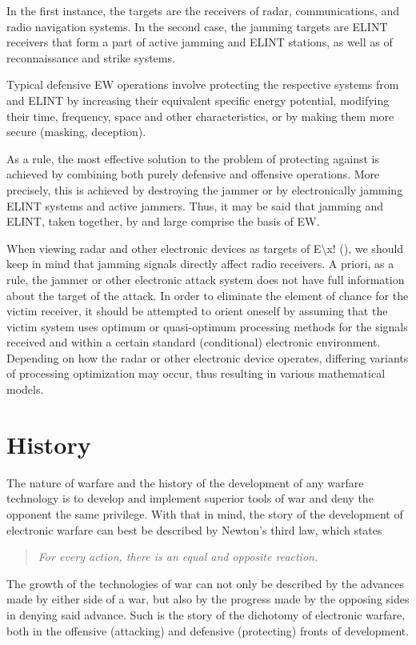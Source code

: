 \documentclass[english,purist]{ist-report}
\begin{document}
In the first instance, the \jamming{} targets are the receivers of radar,
communications, and radio navigation systems. In the second case, the
jamming targets are ELINT receivers that form a part of active jamming and ELINT stations, as well as of reconnaissance and strike systems.

Typical defensive EW operations involve protecting the respective
systems from \jamming{} and ELINT by increasing their equivalent specific
energy potential, modifying their time, frequency, space and other characteristics, or by making them more secure (masking, deception).

As a rule, the most effective solution to the problem of protecting
against \jamming{} is achieved by combining both purely defensive and
offensive operations. More precisely, this is achieved by destroying the jammer or by electronically jamming ELINT systems and active jammers. Thus, it may be said that jamming and ELINT, taken together, by and large comprise the basis of EW. 

When viewing radar and other electronic devices as targets of E\textbackslash x!
(\jamming{}), we should keep in mind that jamming signals directly affect radio receivers. A priori, as a rule, the jammer or other electronic attack system does not have full information about the target of the attack. In order to eliminate the element of chance for the victim receiver, it should be attempted to orient oneself by assuming that the victim system uses optimum or quasi-optimum processing methods for the signals received and within a certain standard (conditional) electronic environment. Depending on how the radar or other electronic device operates, differing variants of processing optimization may occur, thus resulting in various mathematical models.

\part{History}

The nature of warfare and the history of the development of any warfare technology is to develop and implement superior tools of war and deny the opponent the same privilege. With that in mind, the story of the development of electronic warfare can best be described by Newton's third law, which states
\begin{quote}\itshape
    For every action, there is an equal and opposite reaction.
\end{quote}
The growth of the technologies of war can not only be described by the advances made by either side of a war, but also by the progress made by the opposing sides in denying said advance. Such is the story of the dichotomy of electronic warfare, both in the offensive (attacking) and defensive (protecting) fronts of development.
\end{document}
